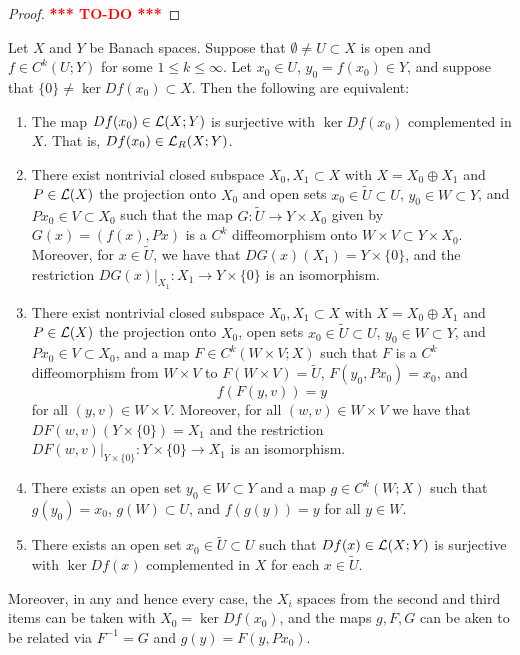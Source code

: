 \documentclass[a4paper]{article}
\newcommand{\TODO}{\textcolor{red}{\textbf{*** TO-DO ***}}}
\begin{document}
\begin{proof}
\TODO
\end{proof}

\begin{thm}
Let $X$ and $Y$ be Banach spaces. Suppose that $\emptyset
\neq U \subset X$ is open and $f \in C^k (U ; Y)$ for
some $1 \leq k \leq \infty$. Let $x_0 \in U$,
$y_0 = f(x_0) \in Y$, and suppose that $\{0\} \neq
\ker Df(x_0) \subset X$. Then the following
are equivalent:

\begin{enumerate}
\item The map $Df(x_0) \in \mathcal{L}(X; Y)$ is surjective with
$\ker Df(x_0)$ complemented in $X$. That is, $Df(x_0)
\in \mathcal{L}_R(X; Y)$.

\item There exist nontrivial closed subspace $X_0, X_1
\subset X$ with $X = X_0 \oplus X_1$ and $P \in \mathcal{L}(X)$
the projection onto $X_0$ and open sets $x_0 \in \tilde{U}
\subset U$, $y_0 \in W \subset Y$, and $Px_0 \in V \subset X_0$
such that the map $G : \tilde{U} \to Y \times X_0$
given by $G(x) = (f(x), Px)$ is a $C^k$ diffeomorphism
onto $W \times V \subset Y \times X_0$. Moreover, for $x
\in \tilde{U}$, we have that $DG(x) (X_1) = Y \times \{0\}$,
and the restriction $DG(x) \vert_{X_1} : X_1 \to Y \times
\{0\}$ is an isomorphism.

\item There exist nontrivial closed subspace $X_0, X_1 \subset
X$ with $X = X_0 \oplus X_1$ and $P \in \mathcal{L}(X)$ the projection
onto $X_0$, open sets $x_0 \in \tilde{U} \subset U$,
$y_0 \in W \subset Y$, and $P x_0 \in V \subset X_0$, and
a map $F \in C^k (W \times V ; X)$ such that $F$ is a
$C^k$ diffeomorphism from $W \times V$ to $F(W \times V)
= \tilde{U}$, $F(y_0, Px_0) = x_0$, and
\[
f(F(y, v)) = y
\]
for all $(y, v) \in W \times V$. Moreover, for all
$(w, v) \in W \times V$ we have that $DF(w, v) (Y \times
\{0\}) = X_1$ and the restriction $DF(w, v) \vert_{Y \times
\{0\}} : Y \times \{0\} \to X_1$ is an isomorphism.

\item There exists an open set $y_0 \in W \subset Y$ and
a map $g \in C^k(W; X)$ such that $g(y_0) = x_0$, $g(W)
\subset U$, and $f(g(y)) = y$ for all $y \in W$.

\item There exists an open set $x_0 \in \tilde{U} \subset U$
such that $Df(x) \in \mathcal{L}(X; Y)$ is surjective with
$\ker Df(x)$ complemented in $X$ for each $x \in \tilde{U}$.
\end{enumerate}
Moreover, in any and hence every case, the $X_i$ spaces
from the second and third items can be taken with $X_0
= \ker Df(x_0)$, and the maps $g, F, G$ can be aken to be
related via $F^{-1} = G$ and $g(y) = F(y, P x_0)$.
\end{thm}
\end{document}
